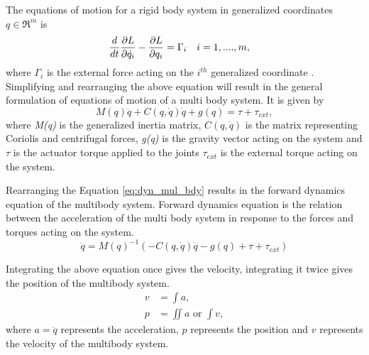 The equations of motion for a rigid body system in generalized coordinates $q \in \Re^m $ is 
\begin{align}
\label{eq:lagrange}
\frac{d}{dt} &\frac{\partial {L}}{\partial {\dot{q}_i}} - \frac{\partial {L}}{\partial {q_i}} = \Gamma_i && i=1,....,m,
\end{align}
where $\Gamma_i$ is the external force acting on the $i^{th}$ generalized coordinate \cite[Chapter 4]{mur94}.
Simplifying and rearranging the above equation will result in the general formulation of equations of motion of a multi body system. It is given by
\begin{equation}
\label{eq:dyn_mul_bdy}
M(q)\ddot{q}+C(q,\dot{q})\dot{q}+g(q) = \tau + \tau_{ext},
\end{equation}
where \emph{M(q)} is the generalized inertia matrix, $C(q,\dot{q})$ is the matrix representing Coriolis and centrifugal forces, \emph{g(q)} is the gravity vector acting on the system and $\tau$ is the actuator torque applied to the joints $\tau_{ext}$ is the external torque acting on the system.

Rearranging the Equation \ref{eq:dyn_mul_bdy} results in the forward dynamics equation of the multibody system. Forward dynamics equation is the relation between the acceleration of the multi body system in response to the forces and torques acting on the system.
\begin{equation}
    \label{eq:fwdyn}
    \ddot{q} = M(q)^{-1} (- C(q,\dot{q})\dot{q} -g(q) + \tau + \tau_{ext})
\end{equation}

Integrating the above equation once gives the velocity, integrating it twice gives the position of the multibody system. 
$$ \begin{aligned} 
    v &= \int a ,\\ 
    p &=  \iint a \text{ or } \int v , 
    \end{aligned}$$ where $a = \ddot{q}$ represents the acceleration, $p$ represents the position and $v$ represents the velocity of the multibody system.

